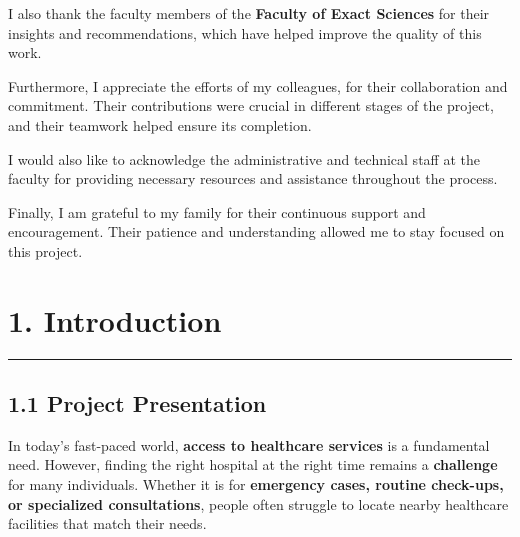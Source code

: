 \documentclass[12pt]{report}
\begin{document}
\noindent I also thank the faculty members of the \textbf{Faculty of Exact Sciences} for their insights and recommendations, which have helped improve the quality of this work.  \vspace*{0.5cm}

\noindent Furthermore, I appreciate the efforts of my colleagues, for their collaboration and commitment. Their contributions were crucial in different stages of the project, and their teamwork helped ensure its completion.  \vspace*{0.5cm}

\noindent I would also like to acknowledge the administrative and technical staff at the faculty for providing necessary resources and assistance throughout the process.  \vspace*{0.5cm}

\noindent Finally, I am grateful to my family for their continuous support and encouragement. Their patience and understanding allowed me to stay focused on this project.

\newpage












\section*{\textbf{1. Introduction}}
\rule{\linewidth}{1pt}  %



\subsection*{\textbf{1.1 Project Presentation}}

In today's fast-paced world, \textbf{access to healthcare services} is a fundamental need. However, finding the right hospital at the right time remains a \textbf{challenge} for many individuals. Whether it is for \textbf{emergency cases, routine check-ups, or specialized consultations}, people often struggle to locate nearby healthcare facilities that match their needs.
\end{document}
